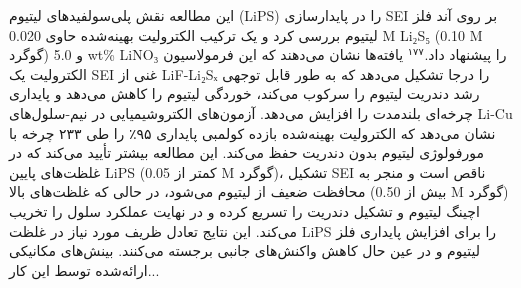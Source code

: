 \documentclass[12pt,a4paper,twocolumn]{article} %
\newcommand{\persian}[1]{\textfarsi{#1}}
\newcommand{\english}[1]{\textenglish{#1}}
\begin{document}
\persian{
این مطالعه نقش پلی‌سولفیدهای لیتیوم (\english{LiPS}) را در پایدارسازی \english{SEI} بر روی آند فلز لیتیوم بررسی کرد و یک ترکیب الکترولیت بهینه‌شده حاوی \english{0.020 M Li₂S₅} (\english{0.10 M} گوگرد) و \english{5.0 wt\% LiNO₃} را پیشنهاد داد.$^{۱۷۷}$ یافته‌ها نشان می‌دهند که این فرمولاسیون الکترولیت یک \english{SEI} غنی از \english{LiF-Li₂Sₓ} را درجا تشکیل می‌دهد که به طور قابل توجهی رشد دندریت لیتیوم را سرکوب می‌کند، خوردگی لیتیوم را کاهش می‌دهد و پایداری چرخه‌ای بلندمدت را افزایش می‌دهد. آزمون‌های الکتروشیمیایی در نیم-سلول‌های \english{Li-Cu} نشان می‌دهد که الکترولیت بهینه‌شده بازده کولمبی پایداری ۹۵٪ را طی ۲۳۳ چرخه با مورفولوژی لیتیوم بدون دندریت حفظ می‌کند. این مطالعه بیشتر تأیید می‌کند که در غلظت‌های پایین \english{LiPS} (کمتر از \english{0.05 M} گوگرد)، تشکیل \english{SEI} ناقص است و منجر به محافظت ضعیف از لیتیوم می‌شود، در حالی که غلظت‌های بالا (بیش از \english{0.50 M} گوگرد) اچینگ لیتیوم و تشکیل دندریت را تسریع کرده و در نهایت عملکرد سلول را تخریب می‌کند. این نتایج تعادل ظریف مورد نیاز در غلظت \english{LiPS} را برای افزایش پایداری فلز لیتیوم و در عین حال کاهش واکنش‌های جانبی برجسته می‌کنند. بینش‌های مکانیکی ارائه‌شده توسط این کار...
}

\end{document}
